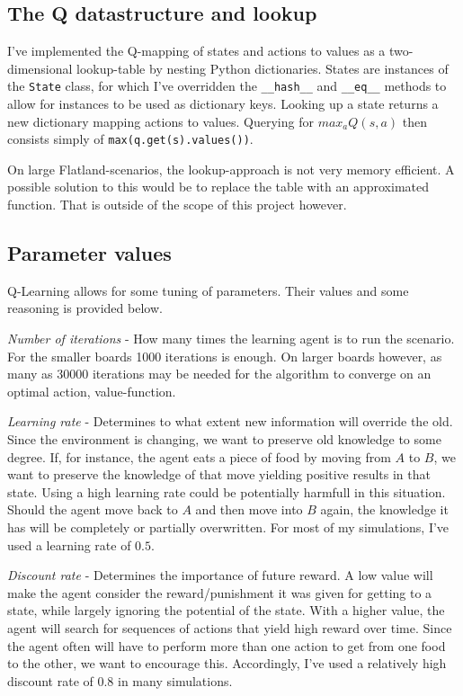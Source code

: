 \documentclass[twoside]{article}
\begin{document}
\begin{multicols}{2}
    \subsection{The Q datastructure and lookup}

    I've implemented the Q-mapping of states and actions to values as a two-dimensional lookup-table by nesting Python dictionaries.
    States are instances of the \texttt{State} class, for which I've overridden the \texttt{\_\_hash\_\_} and \texttt{\_\_eq\_\_} methods to allow for instances to be used as dictionary keys.
    Looking up a state returns a new dictionary mapping actions to values.
    Querying for $max_{a}Q(s, a)$ then consists simply of \texttt{max(q.get(s).values())}.

    On large Flatland-scenarios, the lookup-approach is not very memory efficient.
    A possible solution to this would be to replace the table with an approximated function.
    That is outside of the scope of this project however.

    \subsection{Parameter values}

    Q-Learning allows for some tuning of parameters. Their values and some reasoning is provided below.

    \textit{Number of iterations} - How many times the learning agent is to run the scenario. 
    For the smaller boards 1000 iterations is enough. On larger boards however, as many as 30000 iterations may be needed for the algorithm to converge on an optimal action, value-function.

    \textit{Learning rate} - Determines to what extent new information will override the old.
    Since the environment is changing, we want to preserve old knowledge to some degree.
    If, for instance, the agent eats a piece of food by moving from $A$ to $B$, we want to preserve the knowledge of that move yielding positive results in that state.
    Using a high learning rate could be potentially harmfull in this situation.
    Should the agent move back to $A$ and then move into $B$ again, the knowledge it has will be completely or partially overwritten.
    For most of my simulations, I've used a learning rate of $0.5$.

    \textit{Discount rate} - Determines the importance of future reward.
    A low value will make the agent consider the reward/punishment it was given for getting to a state, while largely ignoring the potential of the state.
    With a higher value, the agent will search for sequences of actions that yield high reward over time.
    Since the agent often will have to perform more than one action to get from one food to the other, we want to encourage this.
    Accordingly, I've used a relatively high discount rate of $0.8$ in many simulations.
    


\end{multicols}
\end{document}

